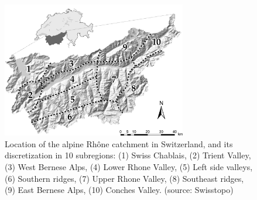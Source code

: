 \documentclass{ametsoc}
\begin{document}
%


\begin{figure}[t]
	\centerline{\includegraphics[width=19pc,angle=0]{fig01.pdf}}
	\caption{Location of the alpine Rh\^{o}ne catchment in Switzerland, and its discretization in 10 subregions:	(1) Swiss Chablais, (2) Trient Valley, (3) West Bernese Alps, (4) Lower Rhone Valley, (5) Left side valleys, (6) Southern ridges, (7) Upper Rhone Valley, (8) Southeast ridges, (9) East Bernese Alps, (10) Conches Valley. (source: Swisstopo)}
	\label{fig:map}
\end{figure}
\end{document}
